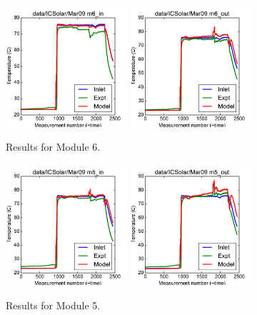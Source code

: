 \documentclass{article}
\begin{document}
\begin{figure}[!ht]
\centering
\includegraphics[width=0.4\textwidth]{../../data/ICSolar/images/Mar09_m6_in.pdf}\hspace{0.05\textwidth}
\includegraphics[width=0.4\textwidth]{../../data/ICSolar/images/Mar09_m6_out.pdf}\hspace{0.05\textwidth}\\
\caption{Results for Module 6.}\end{figure}
\begin{figure}[!ht]
\centering
\includegraphics[width=0.4\textwidth]{../../data/ICSolar/images/Mar09_m5_in.pdf}\hspace{0.05\textwidth}
\includegraphics[width=0.4\textwidth]{../../data/ICSolar/images/Mar09_m5_out.pdf}\hspace{0.05\textwidth}\\
\caption{Results for Module 5.}\end{figure}
\end{document}
